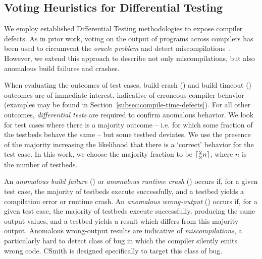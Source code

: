 \subsection{Voting Heuristics for Differential Testing}

We employ established Differential Testing methodologies to expose compiler defects. As in prior work, voting on the output of programs across compilers has been used to circumvent the \emph{oracle problem} and detect miscompilations~\cite{McKeeman1998}. However, we extend this approach to describe not only miscompilations, but also anomalous build failures and crashes.


%

When evaluating the outcomes of test cases, build crash (\bc) and build timeout (\bto) outcomes are of immediate interest, indicative of erroneous compiler behavior (examples may be found in Section~\ref{subsec:compile-time-defects}). For all other outcomes, \emph{differential tests} are required to confirm anomalous behavior. We look for test cases where there is a majority outcome -- i.e. for which some fraction of the testbeds behave the same -- but some testbed deviates. We use the presence of the majority increasing the likelihood that there is a `correct' behavior for the test case. In this work, we choose the majority fraction to be $\lceil\frac{2}{3}n\rceil$, where $n$ is the number of testbeds.

An \emph{anomalous build failure} (\abf) or \emph{anomalous runtime crash} (\arc) occurs if, for a given test case, the majority of testbeds execute successfully, and a testbed yields a compilation error or runtime crash.
An \emph{anomalous wrong-output} (\awo) occurs if, for a given test case, the majority of testbeds execute successfully, producing the same output values, and a testbed yields a result which differs from this majority output. Anomalous wrong-output results are indicative of \emph{miscompilations}, a particularly hard to detect class of bug in which the compiler silently emits wrong code. CSmith is designed specifically to target this class of bug.

